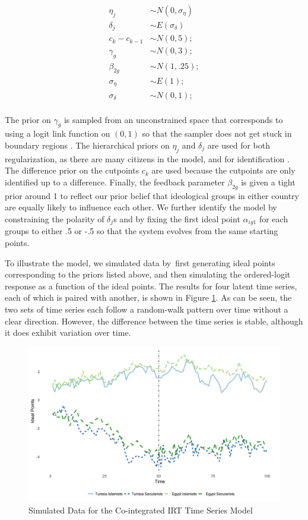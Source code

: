 \documentclass[12pt]{article}
\begin{document}
\begin{align*}
	\eta_j &\sim N(0,\sigma_{\eta})\\
	\delta_j &\sim E(\sigma_{\delta}) \\
	c_{k} - c_{k-1} &\sim N(0,5);\\
	\gamma_g &\sim N(0,3);\\
	\beta_{2g} &\sim  N(1,.25);\\
	\sigma_{\eta} &\sim E(1);\\
	\sigma_{\delta} &\sim N(0,1);\\
\end{align*}

The prior on $\gamma_g$ is sampled from an unconstrained space that corresponds to using a logit link function on $(0,1)$ so that the sampler does not get stuck in boundary regions \parencite{stan2016}. The hierarchical priors on $\eta_j$ and $\delta_j$ are used for both regularization, as there are many citizens in the model, and for identification \parencite{gelman2005}. The difference prior on the cutpoints $c_k$ are used because the cutpoints are only identified up to a difference. Finally, the feedback parameter $\beta_{2g}$ is given a tight prior around 1 to reflect our prior belief that ideological groups in either country are equally likely to influence each other. We further identify the model by constraining the polarity of $\delta_j$s and by fixing the first ideal point $\alpha_{ig1}$ for each groups to either .5 or -.5 so that the system evolves from the same starting points.

 To illustrate the model, we simulated data by first generating ideal points corresponding to the priors listed above, and then simulating the ordered-logit response as a function of the ideal points. The results for four latent time series, each of which is paired with another, is shown in Figure \ref{sim_data}. As can be seen, the two sets of time series each follow a random-walk pattern over time without a clear direction. However, the difference between the time series is stable, although it does exhibit variation over time. 
 \begin{figure}[!h]
 	\caption{Simulated Data for the Co-integrated IRT Time Series Model}\label{sim_data}
 	\centering
	\includegraphics[width=.9\linewidth]{ecm_example.png}
 \end{figure}
\end{document}
